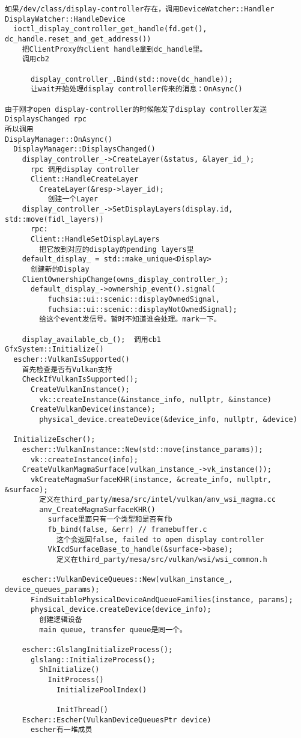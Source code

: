 \begin{verbatim}
如果/dev/class/display-controller存在，调用DeviceWatcher::Handler
DisplayWatcher::HandleDevice
  ioctl_display_controller_get_handle(fd.get(), dc_handle.reset_and_get_address())
    把ClientProxy的client handle拿到dc_handle里。
    调用cb2

      display_controller_.Bind(std::move(dc_handle));
      让wait开始处理display controller传来的消息：OnAsync()

由于刚才open display-controller的时候触发了display controller发送DisplaysChanged rpc
所以调用
DisplayManager::OnAsync()
  DisplayManager::DisplaysChanged()
    display_controller_->CreateLayer(&status, &layer_id_);
      rpc 调用display controller
      Client::HandleCreateLayer
        CreateLayer(&resp->layer_id);
          创建一个Layer
    display_controller_->SetDisplayLayers(display.id, std::move(fidl_layers))
      rpc:
      Client::HandleSetDisplayLayers
        把它放到对应的display的pending layers里
    default_display_ = std::make_unique<Display>
      创建新的Display    
    ClientOwnershipChange(owns_display_controller_);
      default_display_->ownership_event().signal(
          fuchsia::ui::scenic::displayOwnedSignal,
          fuchsia::ui::scenic::displayNotOwnedSignal);
        给这个event发信号。暂时不知道谁会处理。mark一下。

    display_available_cb_();  调用cb1
GfxSystem::Initialize()
  escher::VulkanIsSupported()
    首先检查是否有Vulkan支持
    CheckIfVulkanIsSupported();
      CreateVulkanInstance();
        vk::createInstance(&instance_info, nullptr, &instance)
      CreateVulkanDevice(instance);
        physical_device.createDevice(&device_info, nullptr, &device)

  InitializeEscher();
    escher::VulkanInstance::New(std::move(instance_params));
      vk::createInstance(info);
    CreateVulkanMagmaSurface(vulkan_instance_->vk_instance());
      vkCreateMagmaSurfaceKHR(instance, &create_info, nullptr, &surface);
        定义在third_party/mesa/src/intel/vulkan/anv_wsi_magma.cc
        anv_CreateMagmaSurfaceKHR()
          surface里面只有一个类型和是否有fb
          fb_bind(false, &err) // framebuffer.c
            这个会返回false, failed to open display controller
          VkIcdSurfaceBase_to_handle(&surface->base);
            定义在third_party/mesa/src/vulkan/wsi/wsi_common.h

    escher::VulkanDeviceQueues::New(vulkan_instance_, device_queues_params);
      FindSuitablePhysicalDeviceAndQueueFamilies(instance, params);
      physical_device.createDevice(device_info);
        创建逻辑设备
        main queue, transfer queue是同一个。

    escher::GlslangInitializeProcess();
      glslang::InitializeProcess();
        ShInitialize()
          InitProcess()
            InitializePoolIndex()

            InitThread()
    Escher::Escher(VulkanDeviceQueuesPtr device)
      escher有一堆成员
\end{verbatim}